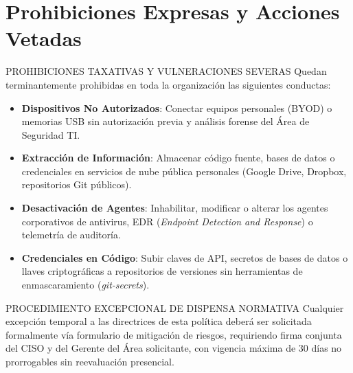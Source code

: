 \documentclass[11pt,letterpaper]{article}
\begin{document}
\newpage

\section{Prohibiciones Expresas y Acciones Vetadas}

\begin{corpalert}{PROHIBICIONES TAXATIVAS Y VULNERACIONES SEVERAS}
  Quedan terminantemente prohibidas en toda la organizaci\'on las siguientes conductas:
  \begin{itemize}[leftmargin=1.5em, itemsep=2pt, topsep=1pt]
    \item \textbf{Dispositivos No Autorizados}: Conectar equipos personales (BYOD) o memorias USB sin autorizaci\'on previa y an\'alisis forense del \'Area de Seguridad TI.
    \item \textbf{Extracci\'on de Informaci\'on}: Almacenar c\'odigo fuente, bases de datos o credenciales en servicios de nube p\'ublica personales (Google Drive, Dropbox, repositorios Git p\'ublicos).
    \item \textbf{Desactivaci\'on de Agentes}: Inhabilitar, modificar o alterar los agentes corporativos de antivirus, EDR (\textit{Endpoint Detection and Response}) o telemetr\'ia de auditor\'ia.
    \item \textbf{Credenciales en C\'odigo}: Subir claves de API, secretos de bases de datos o llaves criptogr\'aficas a repositorios de versiones sin herramientas de enmascaramiento (\textit{git-secrets}).
  \end{itemize}
\end{corpalert}

\vspace{0.4em}

\begin{corpnote}{PROCEDIMIENTO EXCEPCIONAL DE DISPENSA NORMATIVA}
  Cualquier excepci\'on temporal a las directrices de esta pol\'itica deber\'a ser solicitada formalmente v\'ia formulario de mitigaci\'on de riesgos, requiriendo firma conjunta del CISO y del Gerente del \'Area solicitante, con vigencia m\'axima de 30 d\'ias no prorrogables sin reevaluaci\'on presencial.
\end{corpnote}

\vspace{0.4em}
\end{document}
